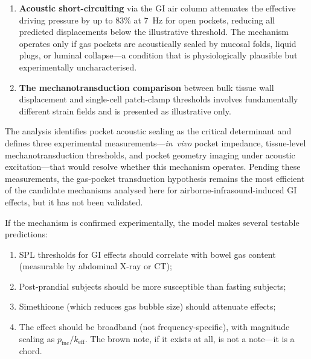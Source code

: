\documentclass[12pt]{article}
\begin{document}
\begin{enumerate}
  \item \textbf{Acoustic short-circuiting} via the GI air column
        attenuates the effective driving pressure by up to 83\% at
        \SI{7}{\hertz} for open pockets, reducing all predicted
        displacements below the illustrative threshold.  The mechanism
        operates only if gas pockets are acoustically sealed by mucosal
        folds, liquid plugs, or luminal collapse---a condition that is
        physiologically plausible but experimentally uncharacterised.
  \item \textbf{The mechanotransduction comparison} between bulk tissue
        wall displacement and single-cell patch-clamp thresholds involves
        fundamentally different strain fields and is presented as
        illustrative only.
\end{enumerate}

The analysis identifies pocket acoustic sealing as the critical determinant
and defines three experimental measurements---\emph{in~vivo} pocket
impedance, tissue-level mechanotransduction thresholds, and pocket geometry
imaging under acoustic excitation---that would resolve whether this
mechanism operates.  Pending these measurements, the gas-pocket
transduction hypothesis remains the most efficient of the candidate
mechanisms analysed here for airborne-infrasound-induced GI effects, but it has not been
validated.

If the mechanism is confirmed experimentally, the model makes several
testable predictions:
\begin{enumerate}
  \item SPL thresholds for GI effects should correlate with bowel gas
        content (measurable by abdominal X-ray or CT);
  \item Post-prandial subjects should be more susceptible than fasting
        subjects;
  \item Simethicone (which reduces gas bubble size) should attenuate
        effects;
  \item The effect should be broadband (not frequency-specific), with
        magnitude scaling as $p_\text{inc}/k_\text{eff}$.
        The brown note, if it exists at all, is not a note---it is a chord.
\end{enumerate}


\end{document}
